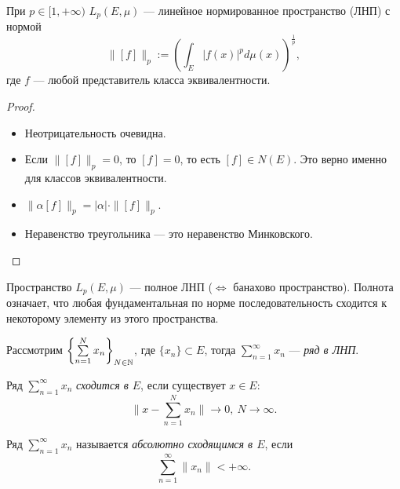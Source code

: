 \begin{theorem}
    При $p \in [1, +\infty)$ $L_p(E,\mu)$ — линейное нормированное пространство (ЛНП) с нормой 
    \[\|[f]\|_p := \left(\int_E |f(x)|^p d\mu(x)\right)^{\frac{1}{p}},\]
    где $f$ — любой представитель класса эквивалентности.
\end{theorem} 
\begin{proof}\tab
    \begin{itemize}
        \item Неотрицательность очевидна.
        \item Если $\|[f]\|_p = 0$, то $[f] = 0$, то есть $[f] \in N(E)$. Это верно именно для классов эквивалентности.
        \item $\|\alpha [f]\|_p = |\alpha| \cdot \|[f]\|_p$.
        \item Неравенство треугольника — это неравенство Минковского.
    \end{itemize}
\end{proof} 

Пространство $L_p(E, \mu)$ — полное ЛНП ($\Longleftrightarrow$  банахово пространство).
Полнота означает, что любая фундаментальная по норме последовательность сходится к некоторому элементу из этого пространства.

\begin{definition}
    Рассмотрим $\left\{\sum\limits_{n=1}^{N} x_n\right\}_{N \in \mathbb{N}}$, где $\{x_n\} \subset E$, тогда $\sum\limits_{n=1}^{\infty}x_n$ — \textit{ряд в ЛНП}.
\end{definition} 

\begin{definition}
    Ряд $\sum\limits_{n=1}^{\infty}x_n$ \textit{сходится в $E$}, если существует $x \in E$: \[\|x - \sum\limits_{n=1}^{N}x_n\| \to 0, \ N \to \infty.\]
\end{definition} 

\begin{definition}
    Ряд $\sum\limits_{n=1}^{\infty}x_n$ называется \textit{абсолютно сходящимся в $E$}, если $$\sum\limits_{n=1}^{\infty}\|x_n\| < +\infty.$$
\end{definition} 


